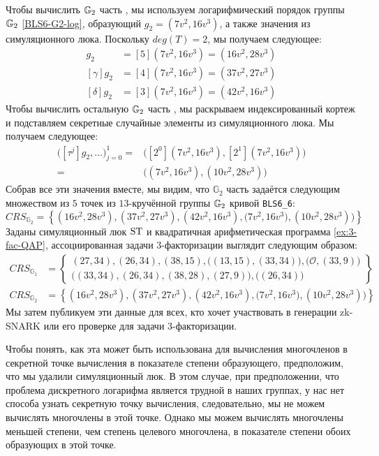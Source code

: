\begin{example}
Чтобы вычислить $\mathbb{G}_2$ часть , мы используем логарифмический порядок группы $\mathbb{G}_2$ \ref{BLS6-G2-log}, образующий $g_2=(7v^2,16v^3)$, а также значения из симуляционного люка. Поскольку $deg(T)=2$, мы получаем следующее:
\begin{align*}
[\beta]g_2 & = [5](7v^2,16v^3) = (16v^2,28v^3) \\
[\gamma]g_2 & = [4](7v^2,16v^3) = (37v^2,27v^3) \\
[\delta]g_2 & = [3](7v^2,16v^3) = (42v^2,16v^3)
\end{align*}
Чтобы вычислить остальную $\mathbb{G}_2$ часть , мы раскрываем индексированный кортеж и подставляем секретные случайные элементы из симуляционного люка. Мы получаем следующее:
\begin{align*}
\Big( [\tau^{j}]g_2,\ldots\Big) _{j=0}^{1} = 
 & \Big( [2^0](7v^2,16v^3), [2^1](7v^2,16v^3)\Big)  \\
 = & \Big((7v^2,16v^3),(10v^2,28v^3)\Big)
\end{align*}
Собрав все эти значения вместе, мы видим, что $\mathbb{G}_2$ часть  задаётся следующим множеством из $5$ точек из $13$-кручённой группы $\mathbb{G}_2$ кривой \texttt{BLS6\_6}:
$$
CRS_{\mathbb{G}_{2}}=\left\{(16v^2,28v^3) ,(37v^2,27v^3),(42v^2,16v^3),\Big(7v^2,16v^3), (10v^2,28v^3)\Big)\right\} 
$$
Заданы симуляционный люк $\mathrm{ST}$ и квадратичная арифметическая программа \ref{ex:3-fac-QAP}, ассоциированная  задачи 3-факторизации выглядит следующим образом:
\begin{align*}
CRS_{\mathbb{G}_{1}} &=\left\{ \begin{array}{c}
(27,34),(26,34),(38,15),\Big((13,15),(33,34)\Big),
\Big(\mathcal{O}, (33,9)\Big)\\
\Big((33,34),(26,34),(38,28),(27,9)\Big),
\Big((26,34)\Big)
\end{array}\right\}\\
CRS_{\mathbb{G}_{2}} &=\left\{(16v^2,28v^3) ,(37v^2,27v^3),(42v^2,16v^3),\Big(7v^2,16v^3), (10v^2,28v^3)\Big)\right\}
\end{align*}
Мы затем публикуем эти данные для всех, кто хочет участвовать в генерации zk-SNARK или его проверке для задачи 3-факторизации.

Чтобы понять, как эта  может быть использована для вычисления многочленов в секретной точке вычисления в показателе степени образующего, предположим, что мы удалили симуляционный люк. В этом случае, при предположении, что проблема дискретного логарифма является трудной в наших группах, у нас нет способа узнать секретную точку вычисления, следовательно, мы не можем вычислять многочлены в этой точке. Однако мы можем вычислять многочлены меньшей степени, чем степень целевого многочлена, в показателе степени обоих образующих в этой точке.


\end{example}
